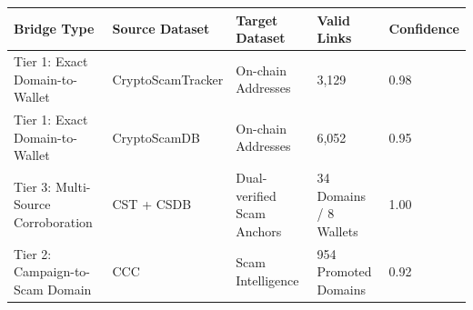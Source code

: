 \begin{tabular}{lllll}
\toprule
Bridge Type & Source Dataset & Target Dataset & Valid Links & Confidence \\
\midrule
Tier 1: Exact Domain-to-Wallet & CryptoScamTracker & On-chain Addresses & 3,129 & 0.98 \\
Tier 1: Exact Domain-to-Wallet & CryptoScamDB & On-chain Addresses & 6,052 & 0.95 \\
Tier 3: Multi-Source Corroboration & CST + CSDB & Dual-verified Scam Anchors & 34 Domains / 8 Wallets & 1.00 \\
Tier 2: Campaign-to-Scam Domain & CCC & Scam Intelligence & 954 Promoted Domains & 0.92 \\
\bottomrule
\end{tabular}
